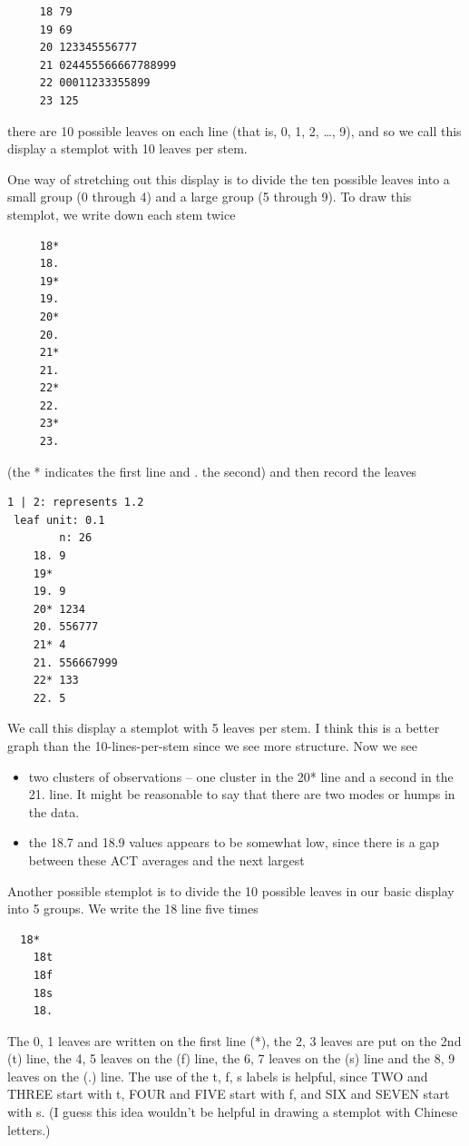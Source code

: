 \documentclass[
]{book}
\providecommand{\tightlist}{%
  \setlength{\itemsep}{0pt}\setlength{\parskip}{0pt}}
\begin{document}
\begin{verbatim}
     18 79
     19 69
     20 123345556777
     21 024455566667788999
     22 00011233355899
     23 125
\end{verbatim}

there are 10 possible leaves on each line (that is, 0, 1, 2, \ldots, 9), and so we call this display a stemplot with 10 leaves per stem.

One way of stretching out this display is to divide the ten possible leaves into a small group (0 through 4) and a large group (5 through 9). To draw this stemplot, we write down each stem twice

\begin{verbatim}
     18*
     18.
     19*
     19.
     20*
     20.
     21*
     21.
     22*
     22.
     23*
     23.
\end{verbatim}

(the * indicates the first line and . the second) and then record the leaves

\begin{verbatim}
1 | 2: represents 1.2
 leaf unit: 0.1
        n: 26
    18. 9
    19* 
    19. 9
    20* 1234
    20. 556777
    21* 4
    21. 556667999
    22* 133
    22. 5
\end{verbatim}

We call this display a stemplot with 5 leaves per stem. I think this is a better graph than the 10-lines-per-stem since we see more structure. Now we see

\begin{itemize}
\tightlist
\item
  two clusters of observations -- one cluster in the 20* line and a second in the 21. line. It might be reasonable to say that there are two modes or humps in the data.
\item
  the 18.7 and 18.9 values appears to be somewhat low, since there is a gap between these ACT averages and the next largest
\end{itemize}

Another possible stemplot is to divide the 10 possible leaves in our basic display into 5 groups. We write the 18 line five times

\begin{verbatim}
  18*
    18t
    18f
    18s
    18.
\end{verbatim}

The 0, 1 leaves are written on the first line (*), the 2, 3 leaves are put on the 2nd (t) line, the 4, 5 leaves on the (f) line, the 6, 7 leaves on the (s) line and the 8, 9 leaves on the (.) line. The use of the t, f, s labels is helpful, since TWO and THREE start with t, FOUR and FIVE start with f, and SIX and SEVEN start with s. (I guess this idea wouldn't be helpful in drawing a stemplot with Chinese letters.)
\end{document}
